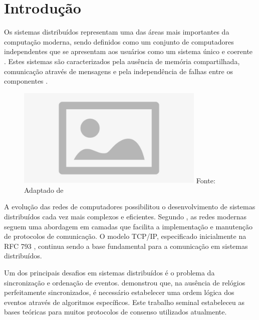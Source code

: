 \section{Introdução}

Os sistemas distribuídos representam uma das áreas mais importantes da computação moderna, sendo definidos como um conjunto de computadores independentes que se apresentam aos usuários como um sistema único e coerente \cite{tanenbaum2016sistemas}. Estes sistemas são caracterizados pela ausência de memória compartilhada, comunicação através de mensagens e pela independência de falhas entre os componentes \cite{coulouris2013sistemas}.

\begin{figure}[H]
\centering
{}
\includegraphics[width=0.8\textwidth]{figure/placeholder.jpg}
\label{fig:arquitetura_distribuida}
{\fontsize{10pt}{\baselineskip}\selectfont
  Fonte: Adaptado de }
\end{figure}

A evolução das redes de computadores possibilitou o desenvolvimento de sistemas distribuídos cada vez mais complexos e eficientes. Segundo , as redes modernas seguem uma abordagem em camadas que facilita a implementação e manutenção de protocolos de comunicação. O modelo TCP/IP, especificado inicialmente na RFC 793 \cite{rfc793:1981}, continua sendo a base fundamental para a comunicação em sistemas distribuídos.

Um dos principais desafios em sistemas distribuídos é o problema da sincronização e ordenação de eventos.  demonstrou que, na ausência de relógios perfeitamente sincronizados, é necessário estabelecer uma ordem lógica dos eventos através de algoritmos específicos. Este trabalho seminal estabeleceu as bases teóricas para muitos protocolos de consenso utilizados atualmente.

